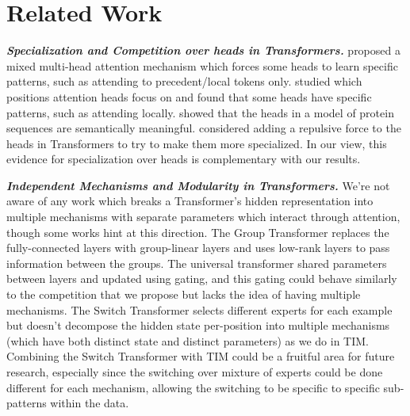 \documentclass{article}
\newcommand{\Ani}[1]{{\color{blue} [AG: #1]}}
\begin{document}
\section{Related Work}

{\bfseries \itshape Specialization and Competition over heads in Transformers.} \citet{cui2019mixed} proposed a mixed multi-head attention mechanism which forces some heads to learn specific patterns, such as attending to precedent/local tokens only.  \citet{clark2019does} studied which positions attention heads focus on and found that some heads have specific patterns, such as attending locally. \citet{vig2020bertology} showed that the heads in a model of protein sequences are semantically meaningful.  \citet{an2020repulsive} considered adding a repulsive force to the heads in Transformers to try to make them more specialized.  In our view, this evidence for specialization over heads is complementary with our results. 


{\bfseries \itshape Independent Mechanisms and Modularity in Transformers.} We're not aware of any work which breaks a Transformer's hidden representation into multiple mechanisms with separate parameters which interact through attention, though some works hint at this direction.  The Group Transformer \citep{park2020grouptransformer} replaces the fully-connected layers with group-linear layers and uses low-rank layers to pass information between the groups. The universal transformer \citep{dehghani2018universal} shared parameters between layers and updated using gating, and this gating could behave similarly to the competition that we propose but lacks the idea of having multiple mechanisms.  The Switch Transformer \citep{fedus2021switch} selects different experts for each example but doesn't decompose the hidden state per-position into multiple mechanisms (which have both distinct state and distinct parameters) as we do in TIM.  Combining the Switch Transformer with TIM could be a fruitful area for future research, especially since the switching over mixture of experts could be done different for each mechanism, allowing the switching to be specific to specific sub-patterns within the data.  
\end{document}
